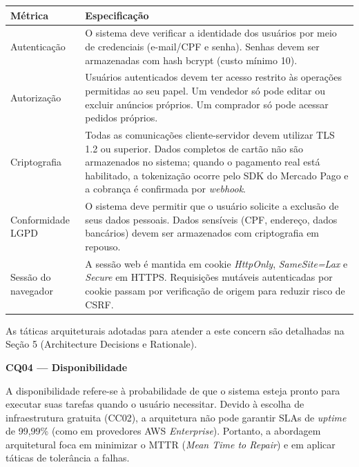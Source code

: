﻿\documentclass[12pt,a4paper]{article}
\begin{document}
\begin{longtable}{|p{4.5cm}|p{10cm}|}
\hline
\textbf{Métrica} & \textbf{Especificação} \\
\hline
Autenticação & O sistema deve verificar a identidade dos usuários por meio de credenciais (e-mail/CPF e senha). Senhas devem ser armazenadas com hash bcrypt (custo mínimo 10). \\
\hline
Autorização & Usuários autenticados devem ter acesso restrito às operações permitidas ao seu papel. Um vendedor só pode editar ou excluir anúncios próprios. Um comprador só pode acessar pedidos próprios. \\
\hline
Criptografia & Todas as comunicações cliente-servidor devem utilizar TLS 1.2 ou superior. Dados completos de cartão não são armazenados no sistema; quando o pagamento real está habilitado, a tokenização ocorre pelo SDK do Mercado Pago e a cobrança é confirmada por \textit{webhook}. \\
\hline
Conformidade LGPD & O sistema deve permitir que o usuário solicite a exclusão de seus dados pessoais. Dados sensíveis (CPF, endereço, dados bancários) devem ser armazenados com criptografia em repouso. \\
\hline
Sessão do navegador & A sessão web é mantida em cookie \textit{HttpOnly}, \textit{SameSite=Lax} e \textit{Secure} em HTTPS. Requisições mutáveis autenticadas por cookie passam por verificação de origem para reduzir risco de CSRF. \\
\hline
\end{longtable}

\noindent As táticas arquiteturais adotadas para atender a este concern são detalhadas na Seção 5 (Architecture Decisions e Rationale).

\vspace{0.5cm}

\noindent\textbf{CQ04 --- Disponibilidade}

A disponibilidade refere-se à probabilidade de que o sistema esteja pronto para executar suas tarefas quando o usuário necessitar. Devido à escolha de infraestrutura gratuita (CC02), a arquitetura não pode garantir SLAs de \textit{uptime} de 99,99\% (como em provedores AWS \textit{Enterprise}). Portanto, a abordagem arquitetural foca em minimizar o MTTR (\textit{Mean Time to Repair}) e em aplicar táticas de tolerância a falhas.
\end{document}
